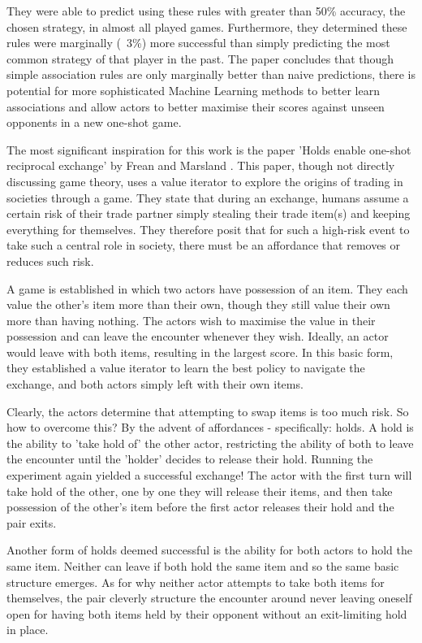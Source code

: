 They were able to predict using these rules with greater than 50\% accuracy, the chosen strategy, in almost all played games. Furthermore, they determined these rules were marginally (~3\%) more successful than simply predicting the most common strategy of that player in the past. The paper concludes that though simple association rules are only marginally better than naive predictions, there is potential for more sophisticated Machine Learning methods to better learn associations and allow actors to better maximise their scores against unseen opponents in a new one-shot game.

The most significant inspiration for this work is the paper 'Holds enable one-shot reciprocal exchange' by Frean and Marsland \cite{frean2022holds}. This paper, though not directly discussing game theory, uses a value iterator to explore the origins of trading in societies through a game. They state that during an exchange, humans assume a certain risk of their trade partner simply stealing their trade item(s) and keeping everything for themselves. They therefore posit that for such a high-risk event to take such a central role in society, there must be an affordance that removes or reduces such risk.

A game is established in which two actors have possession of an item. They each value the other's item more than their own, though they still value their own more than having nothing. The actors wish to maximise the value in their possession and can leave the encounter whenever they wish. Ideally, an actor would leave with both items, resulting in the largest score. In this basic form, they established a value iterator to learn the best policy to navigate the exchange, and both actors simply left with their own items.

Clearly, the actors determine that attempting to swap items is too much risk. So how to overcome this? By the advent of affordances - specifically: holds. A hold is the ability to 'take hold of' the other actor, restricting the ability of both to leave the encounter until the 'holder' decides to release their hold. Running the experiment again yielded a successful exchange! The actor with the first turn will take hold of the other, one by one they will release their items, and then take possession of the other's item before the first actor releases their hold and the pair exits.

Another form of holds deemed successful is the ability for both actors to hold the same item. Neither can leave if both hold the same item and so the same basic structure emerges. As for why neither actor attempts to take both items for themselves, the pair cleverly structure the encounter around never leaving oneself open for having both items held by their opponent without an exit-limiting hold in place.

